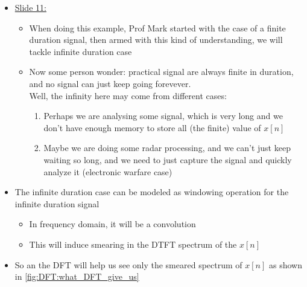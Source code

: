 \begin{itemize}
    
\item \underline{Slide 11:}
    
        \begin{itemize}
            \item When doing this example, Prof Mark started with the case of a finite duration signal, then armed with this kind of understanding, we will tackle infinite duration case
            
            
            \item Now some person wonder: practical signal are always finite in duration, and no signal can just keep going forevever.\\
            
            Well, the infinity here may come from different cases:
            
            
            \begin{enumerate}
                \item Perhaps we are analysing some signal, which is very long and we don't have enough memory to store all (the finite) value of $x[n]$
                
                \item Maybe we are doing some radar processing, and we can't just keep waiting so long, and we need to just capture the signal and quickly analyze it (electronic warfare case)
            \end{enumerate}
            
            
        \end{itemize}
    

\item The infinite duration case can be modeled as windowing operation for the infinite duration signal 

    \begin{itemize}
        \item In frequency domain, it will be a convolution
        
        \item This will induce smearing in the DTFT spectrum of the $x[n]$
    \end{itemize}
   
   
   
\newpage    
\item So an  the DFT will help us see only the smeared spectrum of $x[n]$ as shown in \autoref{fig:DFT:what_DFT_give_us}


\end{itemize}
